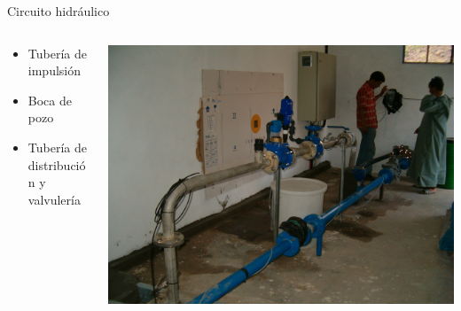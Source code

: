 \documentclass[xcolor={usenames,svgnames,dvipsnames}]{beamer}
\begin{document}
\begin{frame}[plain,label={sec:org4613b25}]{Circuito hidráulico}
\begin{columns}
\begin{column}{0.5\columnwidth}
\begin{itemize}
\item Tubería de impulsión

\item Boca de pozo

\item Tubería de distribución y valvulería
\end{itemize}
\end{column}

\begin{column}{0.6\columnwidth}
\begin{center}
\includegraphics[width=.9\linewidth]{../figs/CircuitoHidraulico.jpg}
\end{center}
\end{column}
\end{columns}
\end{frame}
\end{document}

